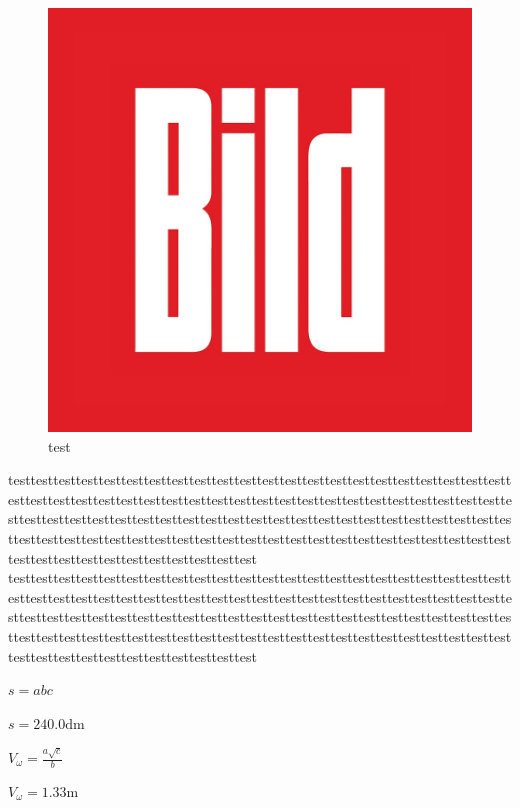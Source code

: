 \documentclass[
]{article}
\begin{document}
\begin{figure}
\hypertarget{fig:test}{%
\centering
\includegraphics{test.jpg}
\caption{test}\label{fig:test}
}
\end{figure}

testtesttesttesttesttesttesttesttesttesttesttesttesttesttesttesttesttesttesttesttesttesttesttesttesttesttesttesttesttesttesttesttesttesttesttesttesttesttesttesttesttesttesttesttesttesttesttesttesttesttesttesttesttesttesttesttesttesttesttesttesttesttesttesttesttesttesttesttesttesttesttesttesttesttesttesttesttesttesttesttesttesttesttesttesttesttesttesttesttesttesttesttesttesttesttesttesttesttesttest
testtesttesttesttesttesttesttesttesttesttesttesttesttesttesttesttesttesttesttesttesttesttesttesttesttesttesttesttesttesttesttesttesttesttesttesttesttesttesttesttesttesttesttesttesttesttesttesttesttesttesttesttesttesttesttesttesttesttesttesttesttesttesttesttesttesttesttesttesttesttesttesttesttesttesttesttesttesttesttesttesttesttesttesttesttesttesttesttesttesttesttesttesttesttesttesttesttesttesttest

\(\displaystyle s = a b c\)

\(\displaystyle s = 240.0 \text{dm}\)

\(\displaystyle V_{\omega} = \frac{a \sqrt{c}}{b}\)

\(\displaystyle V_{\omega} = 1.33 \text{m}\)
\end{document}
